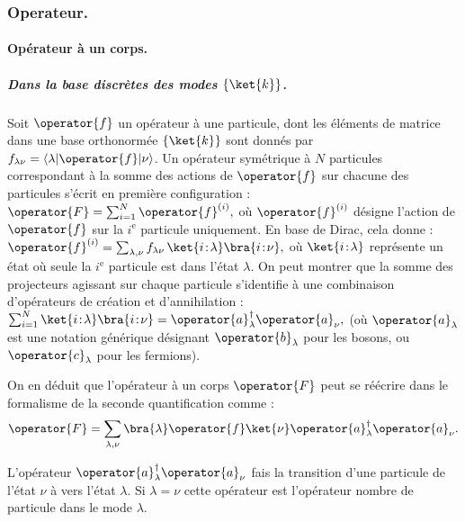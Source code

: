 \subsubsection{Operateur. }


\paragraph{Opérateur à un corps.}

\subparagraph{Dans la base discrètes des modes \( \{ \ket{k} \} \).}

Soit \( \operator{f} \) un opérateur à une particule, dont les éléments de matrice dans une base orthonormée \( \{ \ket{k} \} \) sont donnés par \( f_{\lambda\nu} = \langle \lambda \vert \operator{f} \vert \nu \rangle \). Un opérateur symétrique à \( N \) particules correspondant à la somme des actions de \( \operator{f} \) sur chacune des particules s’écrit en première configuration  :
\(
	\operator{F} = \sum_{i=1}^N \operator{f}^{(i)},
\)
où \( \operator{f}^{(i)} \) désigne l’action de \( \operator{f} \) sur la $i^\text{e}$ particule uniquement. En base de Dirac, cela donne :
\(
	\operator{f}^{(i)} = \sum_{\lambda, \nu} f_{\lambda\nu} \, \ket{i\!:\!\lambda} \bra{i\!:\!\nu},
\)
où \( \ket{i\!:\!\lambda} \) représente un état où seule la $i^\text{e}$ particule est dans l’état \( \lambda \). %
On peut montrer que la somme des projecteurs agissant sur chaque particule s’identifie à une combinaison d’opérateurs de création et d’annihilation :
\(
	\sum_{i=1}^N \ket{i\!:\!\lambda} \bra{i\!:\!\nu} = \operator{a}^\dagger_\lambda \operator{a}_\nu^{},
\)
(où \( \operator{a}_\lambda \) est une notation générique désignant \( \operator{b}_\lambda \) pour les bosons, ou \( \operator{c}_\lambda \) pour les fermions).

On en déduit que l’opérateur à un corps \( \operator{F} \) peut se réécrire dans le formalisme de la seconde quantification comme :
\begin{eqnarray}\label{chap.1:eq.rapel.opp.1.prim.1}
	\operator{F} = \sum_{\lambda, \nu} \bra{\lambda} \operator{f} \ket{\nu} \operator{a}^\dagger_\lambda \operator{a}_\nu^{}.
\end{eqnarray}

L'opérateur $\operator{a}^\dagger_\lambda \operator{a}_\nu^{}$ fais la transition d'une particule de l'état $\nu$ à vers l'état $\lambda$. Si $\lambda = \nu$ cette opérateur est l'opérateur nombre de particule dans le mode $\lambda$.


